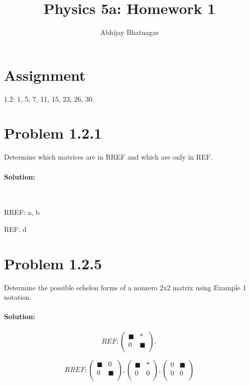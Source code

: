 \documentclass[11pt, notitlepage]{report}
\makeatletter
\newenvironment{solution}{\paragraph{Solution:}}{\hfill}
\newcommand*{\toccontents}{\@starttoc{toc}}
\makeatother
\begin{document}
   \title{Physics 5a: Homework 1}
   \author{Abhijay Bhatnagar}
   \maketitle

   \toccontents



\setcounter{secnumdepth}{0} %
\section{Assignment}

1.2: 1, 5, 7, 11, 15, 23, 26, 30.

\newpage
\section{Problem 1.2.1}

Determine which matrices are in RREF and which are only in REF.

\begin{solution} \

RREF: a, b

REF: d
\end{solution}

\section{Problem 1.2.5}

Determine the possible echelon forms of a nonzero 2x2 matrix using Example 1 notation.

\begin{solution}
 
 \[REF:\left(\begin{matrix}{}
  \blacksquare 	& * 				\\
  0				& \blacksquare 	\\
\end{matrix}\right),
%
\]
 
 \[RREF:\left(\begin{matrix}{}
  \blacksquare 	& 0 				\\
  0				& \blacksquare 	\\
\end{matrix}\right),
%
\left(\begin{matrix}{}
  \blacksquare 	& * 				\\
  0				& 0 				\\
\end{matrix}\right),
%
\left(\begin{matrix}{}
  0				& \blacksquare 	\\
  0				& 0 				\\
\end{matrix}\right)\]
 
\end{solution}
\end{document}
